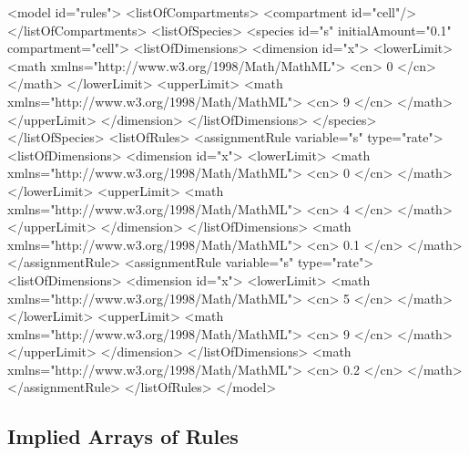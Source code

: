 \documentclass{cekarticle}
\begin{document}
\begin{example}
<model id="rules">
    <listOfCompartments>
        <compartment id="cell"/>
    </listOfCompartments>
    <listOfSpecies>
        <species id="s" initialAmount="0.1" compartment="cell">
            <listOfDimensions>
                <dimension id="x">
                    <lowerLimit>
                        <math xmlns="http://www.w3.org/1998/Math/MathML">
                            <cn> 0 </cn>
                        </math>
                    </lowerLimit>
                    <upperLimit>
                        <math xmlns="http://www.w3.org/1998/Math/MathML">
                            <cn> 9 </cn>
                        </math>
                    </upperLimit>
                </dimension>
            </listOfDimensions>
        </species>
    </listOfSpecies>
    <listOfRules>
        <assignmentRule variable="s" type="rate">
            <listOfDimensions>
                <dimension id="x">
                    <lowerLimit>
                        <math xmlns="http://www.w3.org/1998/Math/MathML">
                            <cn> 0 </cn>
                        </math>
                    </lowerLimit>
                    <upperLimit>
                        <math xmlns="http://www.w3.org/1998/Math/MathML">
                            <cn> 4 </cn>
                        </math>
                    </upperLimit>
                </dimension>
            </listOfDimensions>
            <math xmlns="http://www.w3.org/1998/Math/MathML">
                <cn> 0.1 </cn>
            </math>
        </assignmentRule>
        <assignmentRule variable="s" type="rate">
            <listOfDimensions>
                <dimension id="x">
                    <lowerLimit>
                        <math xmlns="http://www.w3.org/1998/Math/MathML">
                            <cn> 5 </cn>
                        </math>
                    </lowerLimit>
                    <upperLimit>
                        <math xmlns="http://www.w3.org/1998/Math/MathML">
                            <cn> 9 </cn>
                        </math>
                    </upperLimit>
                </dimension>
            </listOfDimensions>
            <math xmlns="http://www.w3.org/1998/Math/MathML">
                <cn> 0.2 </cn>
            </math>
        </assignmentRule>
    </listOfRules>
</model>
\end{example}

\subsection{Implied Arrays of Rules}
\end{document}

